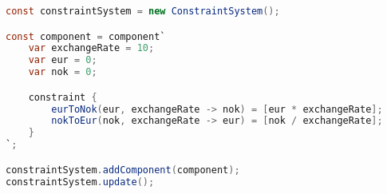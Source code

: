 \documentclass[11pt, a4paper]{article}
\begin{document}
\begin{lstlisting}[language=java, caption={Currency conversion in HotDrink.}, label={lst:currencyhotdrink}]
const constraintSystem = new ConstraintSystem();

const component = component`
    var exchangeRate = 10;
    var eur = 0;
    var nok = 0;

    constraint {
        eurToNok(eur, exchangeRate -> nok) = [eur * exchangeRate];
        nokToEur(nok, exchangeRate -> eur) = [nok / exchangeRate];
    }
`;

constraintSystem.addComponent(component);
constraintSystem.update();
\end{lstlisting}

\clearpage
{}


\end{document}
